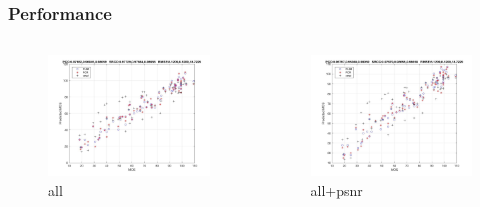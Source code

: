 \documentclass{beamer}
\begin{document}
\begin{frame}
\frametitle{Performance}
\begin{columns}
	\centering
	\begin{column}{6cm}
		\begin{figure}
			\includegraphics[scale=0.17]{images/all_testResult} 
			\centering
			\caption{all}
		\end{figure}
	\end{column}
	\centering
	\begin{column}{6cm}
		\begin{figure}
			\includegraphics[scale=0.17]{images/all+psnr} 
			\centering
			\caption{all+psnr}
		\end{figure}
	\end{column}
\end{columns}
\end{frame} 
\end{document}
